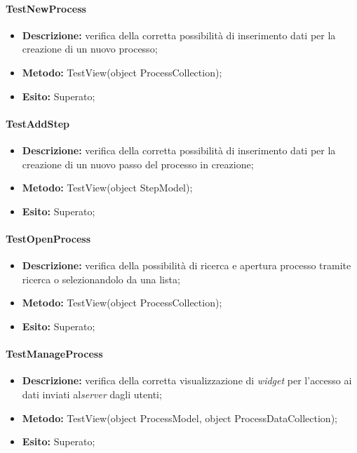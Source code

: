 \paragraph{TestNewProcess}
\begin{itemize}
\item \textbf{Descrizione:} verifica della corretta possibilità di inserimento dati per la creazione di un nuovo processo;
\item \textbf{Metodo:} TestView(object ProcessCollection);
\item \textbf{Esito:} Superato;
\end{itemize}

\paragraph{TestAddStep}
\begin{itemize}
\item \textbf{Descrizione:} verifica della corretta possibilità di inserimento dati per la creazione di un nuovo passo del processo in creazione;
\item \textbf{Metodo:} TestView(object StepModel);
\item \textbf{Esito:} Superato;
\end{itemize}

\paragraph{TestOpenProcess}
\begin{itemize}
\item \textbf{Descrizione:} verifica della possibilità di ricerca e apertura processo tramite ricerca o selezionandolo da una lista;
\item \textbf{Metodo:} TestView(object ProcessCollection);
\item \textbf{Esito:} Superato;
\end{itemize}

\paragraph{TestManageProcess}
\begin{itemize}
\item \textbf{Descrizione:} verifica della corretta visualizzazione di \textit{widget} per l'accesso ai dati inviati al\textit{server} dagli utenti;
\item \textbf{Metodo:} TestView(object ProcessModel, object ProcessDataCollection);
\item \textbf{Esito:} Superato;
\end{itemize}

